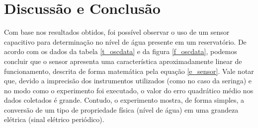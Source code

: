 \newpage
\section{Discussão e Conclusão}
Com base nos resultados obtidos, foi possível observar o uso de um sensor capacitivo para determinação no nível de água presente em um reservatório. 
De acordo com os dados da tabela \ref{t_oscdata} e da figura \ref{f_oscdata}, podemos concluir que o sensor apresenta uma característica aproximadamente linear de funcionamento, descrita de forma matemática pela equação \ref{e_sensor}. Vale notar que, devido a imprecisão dos instrumentos utilizados (como no caso da seringa) e no modo como o experimento foi executado, o valor do erro quadrático médio nos dados coletados é grande.
Contudo, o experimento mostra, de forma simples, a conversão de um tipo de propriedade física (nível de água) em uma grandeza elétrica (sinal elétrico periódico).